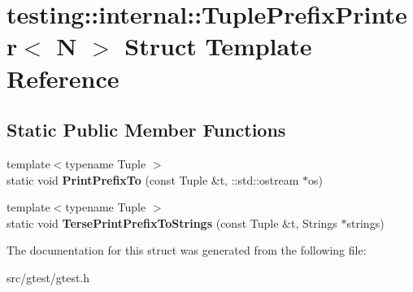 \hypertarget{structtesting_1_1internal_1_1_tuple_prefix_printer}{}\section{testing\+:\+:internal\+:\+:Tuple\+Prefix\+Printer$<$ N $>$ Struct Template Reference}
\label{structtesting_1_1internal_1_1_tuple_prefix_printer}
\subsection*{Static Public Member Functions}
\begin{DoxyCompactItemize}
\item 
\mbox{\label{structtesting_1_1internal_1_1_tuple_prefix_printer_a8841b47290f11315407900183e2fe356}} 
{\footnotesize template$<$typename Tuple $>$ }\\static void {\bfseries Print\+Prefix\+To} (const Tuple \&t, \+::std\+::ostream $\ast$os)
\item 
\mbox{\label{structtesting_1_1internal_1_1_tuple_prefix_printer_afc57456f5cc2a08c11da53094c49dae1}} 
{\footnotesize template$<$typename Tuple $>$ }\\static void {\bfseries Terse\+Print\+Prefix\+To\+Strings} (const Tuple \&t, Strings $\ast$strings)
\end{DoxyCompactItemize}


The documentation for this struct was generated from the following file\+:\begin{DoxyCompactItemize}
\item 
src/gtest/gtest.\+h\end{DoxyCompactItemize}
